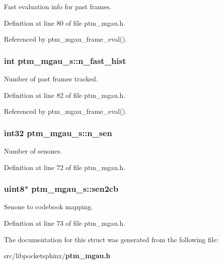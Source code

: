 Fast evaluation info for past frames. 



Definition at line 80 of file ptm\+\_\+mgau.\+h.



Referenced by ptm\+\_\+mgau\+\_\+frame\+\_\+eval().

\subsubsection[{n\+\_\+fast\+\_\+hist}]{\setlength{\rightskip}{0pt plus 5cm}int ptm\+\_\+mgau\+\_\+s\+::n\+\_\+fast\+\_\+hist}\label{structptm__mgau__s_ac491c223199ed5374dfb13fc41854601}


Number of past frames tracked. 



Definition at line 82 of file ptm\+\_\+mgau.\+h.



Referenced by ptm\+\_\+mgau\+\_\+frame\+\_\+eval().

\subsubsection[{n\+\_\+sen}]{\setlength{\rightskip}{0pt plus 5cm}int32 ptm\+\_\+mgau\+\_\+s\+::n\+\_\+sen}\label{structptm__mgau__s_ab0f6c452efe082383e906ac2a4f75de4}


Number of senones. 



Definition at line 72 of file ptm\+\_\+mgau.\+h.

\subsubsection[{sen2cb}]{\setlength{\rightskip}{0pt plus 5cm}uint8$\ast$ ptm\+\_\+mgau\+\_\+s\+::sen2cb}\label{structptm__mgau__s_a5e677255165b8abda63dd1d6dbed1be7}


Senone to codebook mapping. 



Definition at line 73 of file ptm\+\_\+mgau.\+h.



The documentation for this struct was generated from the following file\+:\begin{DoxyCompactItemize}
\item 
src/libpocketsphinx/{\bf ptm\+\_\+mgau.\+h}\end{DoxyCompactItemize}
